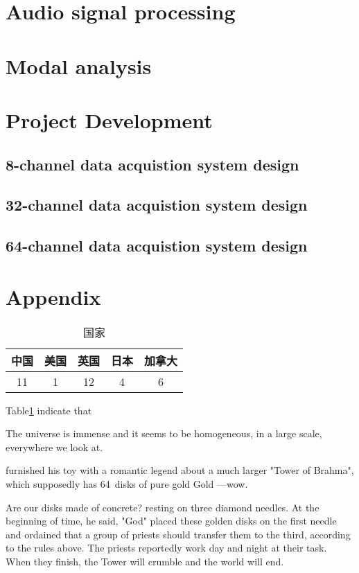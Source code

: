 \documentclass[UTF8]{book}
\begin{document}
	\part{Audio signal processing}
	
	\part{Modal analysis}
	
	\part{Project Development}
	\chapter{8-channel data acquistion system design}
	\chapter{32-channel data acquistion system design}
	\chapter{64-channel data acquistion system design}
	
	\part{Appendix}
	
	



\begin{table}[H]
	\centering
	\caption{国家}
	\begin{tabular}{|c|c|c|c|c|}
		\hline
		中国 &美国 &英国 &日本&加拿大\\
		\hline
		11&1&12&4&6\\
		\hline
	\end{tabular}
	\label{tab2}    
\end{table}

Table\ref{tab2} indicate that

The universe is immense and it seems to be homogeneous, 
in a large scale, everywhere we look at.

furnished his toy with a romantic legend about a much larger
"Tower of Brahma", which supposedly has 64~disks of pure gold
Gold ---wow.\par Are our disks made of concrete? 
resting on three diamond needles. At the beginning of time, he said,
"God" placed these golden disks on the first needle and ordained that a
group of priests should transfer them to the third, according to the
rules above. The priests reportedly work day and night at their task.
When they finish, the Tower will crumble and the world will end.
\end{document}
